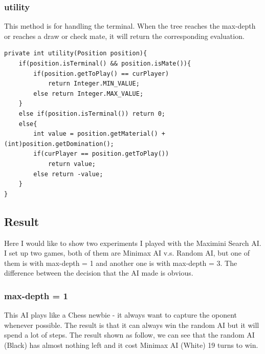 \documentclass{article}
\begin{document}
\subsubsection{utility}
This method is for handling the terminal. When the tree reaches the max-depth or reaches a draw or check mate, it will return the corresponding evaluation.
\begin{lstlisting}
private int utility(Position position){
	if(position.isTerminal() && position.isMate()){
		if(position.getToPlay() == curPlayer)
			return Integer.MIN_VALUE;
		else return Integer.MAX_VALUE;
	}
	else if(position.isTerminal()) return 0;
	else{
		int value = position.getMaterial() + (int)position.getDomination();
		if(curPlayer == position.getToPlay())
			return value;
		else return -value;
	}
}
\end{lstlisting}

\subsection{Result}
Here I would like to show two experiments I played with the Maximini Search AI. I set up two games, both of them are Minimax AI v.s. Random AI, but one of them is with max-depth = 1 and another one is with max-depth = 3. The difference between the decision that the AI made is obvious.
\clearpage
\subsubsection{max-depth = 1}
This AI plays like a Chess newbie - it always want to capture the oponent whenever possible. The result is that it can always win the random AI but it will spend a lot of steps. The result shown as follow, we can see that the random AI (Black) has almost nothing left and it cost Minimax AI (White) 19 turns to win.
\end{document}
